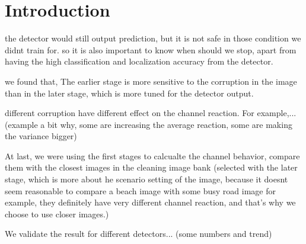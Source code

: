 \section{Introduction}
the detector would still output prediction,
but it is not safe in those condition we didnt train for.
so it is also important to know when should we stop, apart from having the high classification and localization accuracy from the detector.


we found that,
The earlier stage is more sensitive to the corruption in the image than in the later stage, which is more tuned for the detector output.

different corruption have different effect on the channel reaction. For example,... (example a bit why, some are increasing the average reaction, some are making the variance bigger)

At last, we were using the first stages to calcualte the channel behavior, compare them with the closest images in the cleaning image bank (selected with the later stage, which is more about he scenario setting of the image, because it doesnt seem reasonable to compare a beach image with some busy road image for example, they definitely have very different channel reaction, and that's why we choose to use closer images.)

We validate the result for different detectors... (some numbers and trend)

\label{sec:introduction}